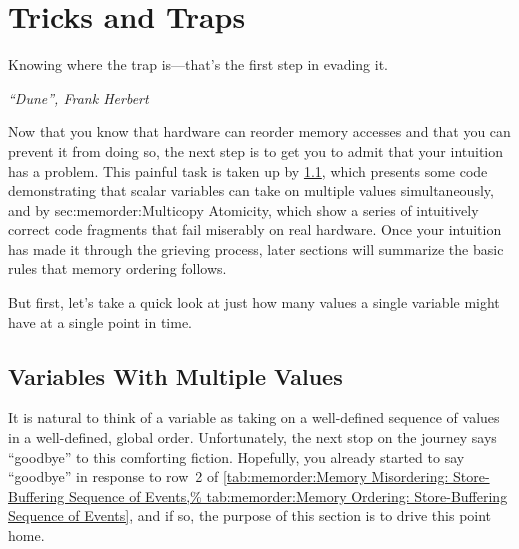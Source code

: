 \QuickQuizEnd

\section{Tricks and Traps}
\label{sec:memorder:Tricks and Traps}
%
\epigraph{Knowing where the trap is---that's the first step in evading it.}
	 {\emph{``Dune'', Frank Herbert}}

Now that you know that hardware can reorder memory accesses and that you
can prevent it from doing so, the next step is to get you to admit
that your intuition has a problem.
This painful task is taken up by
\cref{sec:memorder:Variables With Multiple Values},
which presents some code demonstrating that scalar variables can
take on multiple values simultaneously,
and by
{sec:memorder:Multicopy Atomicity},
which show a series of intuitively correct code fragments that fail miserably
on real hardware.
Once your intuition has made it through the grieving process, later
sections will summarize the basic rules that memory ordering follows.

But first, let's take a quick look at just how many values a single
variable might have at a single point in time.

\subsection{Variables With Multiple Values}
\label{sec:memorder:Variables With Multiple Values}

It is natural to think of a variable as taking on a well-defined
sequence of values in a well-defined, global order.
Unfortunately, the next stop on the journey says ``goodbye'' to this comforting fiction.
Hopefully, you already started to say ``goodbye'' in response to row~2 of
\cref{tab:memorder:Memory Misordering: Store-Buffering Sequence of Events,%
tab:memorder:Memory Ordering: Store-Buffering Sequence of Events},
and if so, the purpose of this section is to drive this point home.


